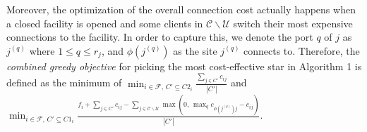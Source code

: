 \documentclass[10pt]{llncs}
\begin{document}
Moreover, the optimization of the overall connection cost actually
happens when a closed facility is opened and some clients in $\mathcal{C}\backslash\mathcal{\mathcal{U}}$
switch their most expensive connections to the facility. In order
to capture this, we denote the port $q$ of $j$ as $j^{\left(q\right)}$
where $1\leq q\leq r_{j}$, and $\phi\left(j^{\left(q\right)}\right)$
as the site $j^{\left(q\right)}$ connects to. Therefore, the\textit{
combined greedy objective} for picking the most cost-effective star
in Algorithm 1 is defined as the minimum of {\footnotesize $\min_{i\in\mathcal{F},\, C'\subseteq C2_{i}}\frac{\sum_{j\in C'}c_{ij}}{\left|C'\right|}$}
and {\footnotesize $\min_{i\in\mathcal{F},\, C'\subseteq C1_{i}}\frac{f_{i}+\sum_{j\in C'}c_{ij}-\sum_{j\in\mathcal{C}\backslash\mathcal{\mathcal{U}}}\max\left(0,\,\max_{q}c_{\phi\left(j^{\left(q\right)}\right)j}-c_{ij}\right)}{\left|C'\right|}$}.
\end{document}
